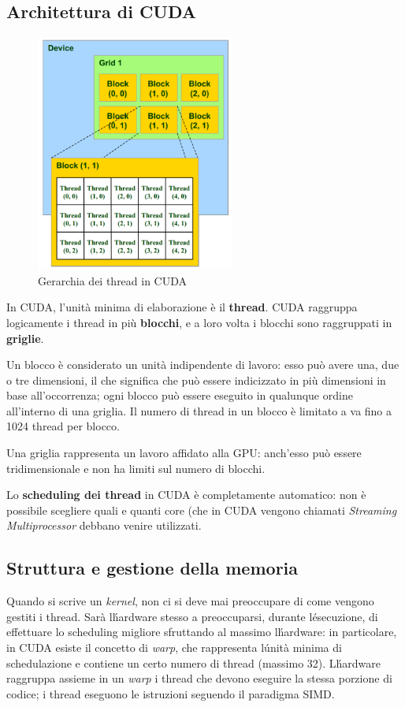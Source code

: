 \documentclass[12pt,a4paper,openright,twoside]{report}
\begin{document}
\subsection{Architettura di CUDA}

\begin{figure}[h]
\centering{}
\includegraphics[width=6.5cm]{grids-and-blocks.png}
\caption{Gerarchia dei thread in CUDA}
\label{img:grids-and-blocks}
\end{figure}

In CUDA, l'unità minima di elaborazione è il \textbf{thread}. CUDA raggruppa logicamente i thread in più \textbf{blocchi}, e a loro volta i blocchi sono raggruppati in \textbf{griglie}.

Un blocco è considerato un unità indipendente di lavoro: esso può avere una, due o tre dimensioni, il che significa che può essere indicizzato in più dimensioni in base all'occorrenza; ogni blocco può essere eseguito in qualunque ordine all'interno di una griglia. Il numero di thread in un blocco è limitato a va fino a 1024 thread per blocco.

Una griglia rappresenta un lavoro affidato alla GPU: anch'esso può essere tridimensionale e non ha limiti sul numero di blocchi.

Lo \textbf{scheduling dei thread} in CUDA è completamente automatico: non è possibile scegliere quali e quanti core (che in CUDA vengono chiamati \textit{Streaming Multiprocessor} debbano venire utilizzati.

\subsection{Struttura e gestione della memoria}

Quando si scrive un \textit{kernel}, non ci si deve mai preoccupare di come vengono gestiti i thread. Sarà l\'hardware stesso a preoccuparsi, durante l\'esecuzione, di effettuare lo scheduling migliore sfruttando al massimo l\'hardware: in particolare, in CUDA esiste il concetto di \textit{warp}, che rappresenta l\'unità minima di schedulazione e contiene un certo numero di thread (massimo 32). L\'hardware raggruppa assieme in un \textit{warp} i thread che devono eseguire la stessa porzione di codice; i thread eseguono le istruzioni seguendo il paradigma SIMD.
\end{document}
